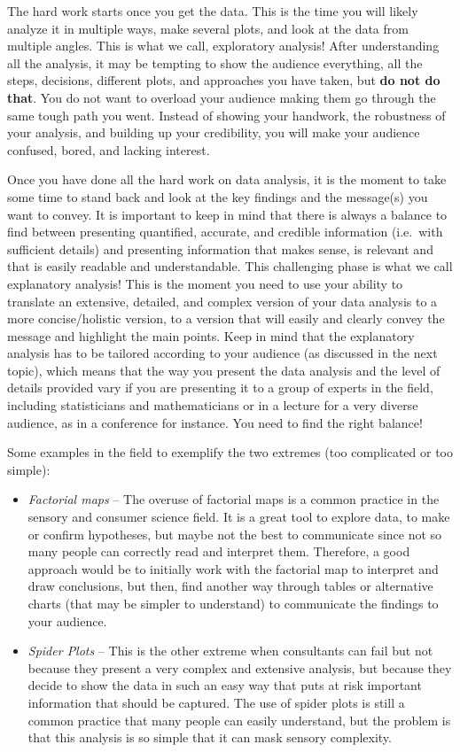 \documentclass[
]{krantz}
\providecommand{\tightlist}{%
  \setlength{\itemsep}{0pt}\setlength{\parskip}{0pt}}
\begin{document}
The hard work starts once you get the data. This is the time you will likely analyze it in multiple ways, make several plots, and look at the data from multiple angles. This is what we call, exploratory analysis! After understanding all the analysis, it may be tempting to show the audience everything, all the steps, decisions, different plots, and approaches you have taken, but \textbf{do not do that}. You do not want to overload your audience making them go through the same tough path you went. Instead of showing your handwork, the robustness of your analysis, and building up your credibility, you will make your audience confused, bored, and lacking interest.

Once you have done all the hard work on data analysis, it is the moment to take some time to stand back and look at the key findings and the message(s) you want to convey. It is important to keep in mind that there is always a balance to find between presenting quantified, accurate, and credible information (i.e.~with sufficient details) and presenting information that makes sense, is relevant and that is easily readable and understandable. This challenging phase is what we call explanatory analysis! This is the moment you need to use your ability to translate an extensive, detailed, and complex version of your data analysis to a more concise/holistic version, to a version that will easily and clearly convey the message and highlight the main points. Keep in mind that the explanatory analysis has to be tailored according to your audience (as discussed in the next topic), which means that the way you present the data analysis and the level of details provided vary if you are presenting it to a group of experts in the field, including statisticians and mathematicians or in a lecture for a very diverse audience, as in a conference for instance. You need to find the right balance!

Some examples in the field to exemplify the two extremes (too complicated or too simple):

\begin{itemize}
\tightlist
\item
  \emph{Factorial maps} -- The overuse of factorial maps is a common practice in the sensory and consumer science field. It is a great tool to explore data, to make or confirm hypotheses, but maybe not the best to communicate since not so many people can correctly read and interpret them. Therefore, a good approach would be to initially work with the factorial map to interpret and draw conclusions, but then, find another way through tables or alternative charts (that may be simpler to understand) to communicate the findings to your audience.
\item
  \emph{Spider Plots} -- This is the other extreme when consultants can fail but not because they present a very complex and extensive analysis, but because they decide to show the data in such an easy way that puts at risk important information that should be captured. The use of spider plots is still a common practice that many people can easily understand, but the problem is that this analysis is so simple that it can mask sensory complexity.
\end{itemize}
\end{document}
